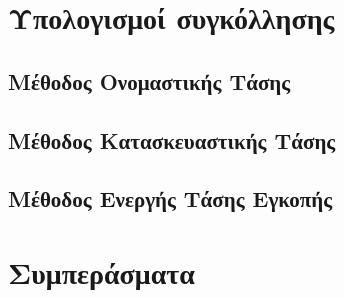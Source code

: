 \documentclass{article}
\begin{document}





\section{Υπολογισμοί συγκόλλησης}
\subsection{Μέθοδος Ονομαστικής Τάσης}

\subsection{Μέθοδος Κατασκευαστικής Τάσης}

\subsection{Μέθοδος Ενεργής Τάσης Εγκοπής}


\section{Συμπεράσματα}

\listoffigures
\listoftables
\end{document}
